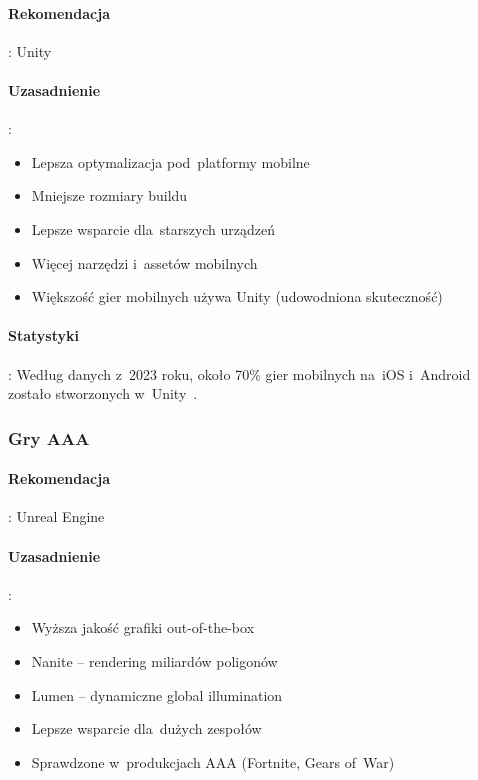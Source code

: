 \paragraph{Rekomendacja}: Unity

\paragraph{Uzasadnienie}:
\begin{itemize}
    \item Lepsza optymalizacja pod~platformy mobilne
    \item Mniejsze rozmiary buildu
    \item Lepsze wsparcie dla~starszych urządzeń
    \item Więcej narzędzi i~assetów mobilnych
    \item Większość gier mobilnych używa Unity (udowodniona skuteczność)
\end{itemize}

\paragraph{Statystyki}:
Według danych z~2023 roku, około 70\% gier mobilnych na~iOS i~Android zostało stworzonych w~Unity~\cite{statista_unity_market, unity_gaming_report}.

\subsubsection{Gry AAA}

\paragraph{Rekomendacja}: Unreal Engine

\paragraph{Uzasadnienie}:
\begin{itemize}
    \item Wyższa jakość grafiki out-of-the-box
    \item Nanite -- rendering miliardów poligonów
    \item Lumen -- dynamiczne global illumination
    \item Lepsze wsparcie dla~dużych zespołów
    \item Sprawdzone w~produkcjach AAA (Fortnite, Gears of~War)
\end{itemize}

